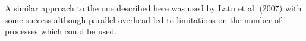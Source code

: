 
A similar approach to the one described here was used by Latu et al. (2007) \cite{ParallelisationSemi-LagrangianVlasovCodes} with some success although parallel overhead led to limitations on the number of processes which could be used.


% 
